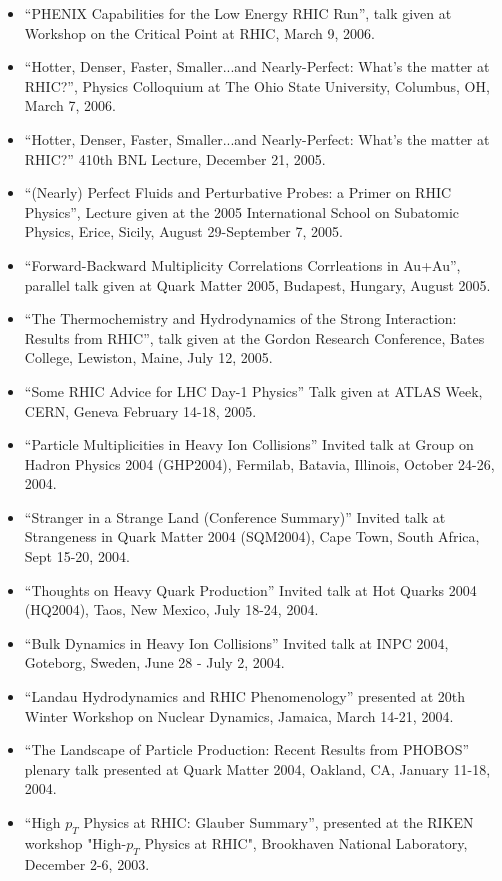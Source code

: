 \documentclass[11 pt]{article}
\begin{document}
\begin{description}
\begin{itemize}
\item ``PHENIX Capabilities for the Low Energy RHIC Run'', talk given at Workshop on the Critical Point at RHIC, March 9, 2006.
\item ``Hotter, Denser, Faster, Smaller...and Nearly-Perfect: What's the matter at RHIC?'', Physics Colloquium at The Ohio State University, Columbus, OH, March 7, 2006.
\item ``Hotter, Denser, Faster, Smaller...and Nearly-Perfect: What's the matter at RHIC?'' 410th BNL Lecture, December 21, 2005.
\item ``(Nearly) Perfect Fluids and Perturbative Probes: a Primer on RHIC Physics'', Lecture given at the 2005 International School on Subatomic Physics, Erice, Sicily, August 29-September 7, 2005.
\item ``Forward-Backward Multiplicity Correlations Corrleations in Au+Au'', parallel talk given at Quark Matter 2005, Budapest, Hungary, August 2005.
\item ``The Thermochemistry and Hydrodynamics of the Strong Interaction: Results from RHIC'', talk given at the Gordon Research Conference, Bates College, Lewiston, Maine, July 12, 2005.
\item ``Some RHIC Advice for LHC Day-1 Physics'' Talk given at ATLAS Week, CERN, Geneva February 14-18, 2005.
\item ``Particle Multiplicities in Heavy Ion Collisions'' Invited talk at Group on Hadron Physics 2004 (GHP2004), Fermilab, Batavia, Illinois, October 24-26, 2004.
\item ``Stranger in a Strange Land (Conference Summary)'' Invited talk at Strangeness in Quark Matter 2004 (SQM2004), Cape Town, South Africa, Sept 15-20, 2004.
\item ``Thoughts on Heavy Quark Production'' Invited talk at Hot Quarks 2004 (HQ2004), Taos, New Mexico, July 18-24, 2004.
\item ``Bulk Dynamics in Heavy Ion Collisions'' Invited talk at INPC 2004, Goteborg, Sweden, June 28 - July 2, 2004.
\item ``Landau Hydrodynamics and RHIC Phenomenology'' presented at 20th Winter Workshop on Nuclear Dynamics, Jamaica, March 14-21, 2004.
\item ``The Landscape of Particle Production: Recent Results from PHOBOS'' plenary talk presented at Quark Matter 2004, Oakland, CA, January 11-18, 2004.
\item ``High $p_T$ Physics at RHIC: Glauber Summary'', presented at the RIKEN workshop "High-$p_T$ Physics at RHIC", Brookhaven National Laboratory, December 2-6, 2003.

\end{itemize}
\end{description}
\end{document}
